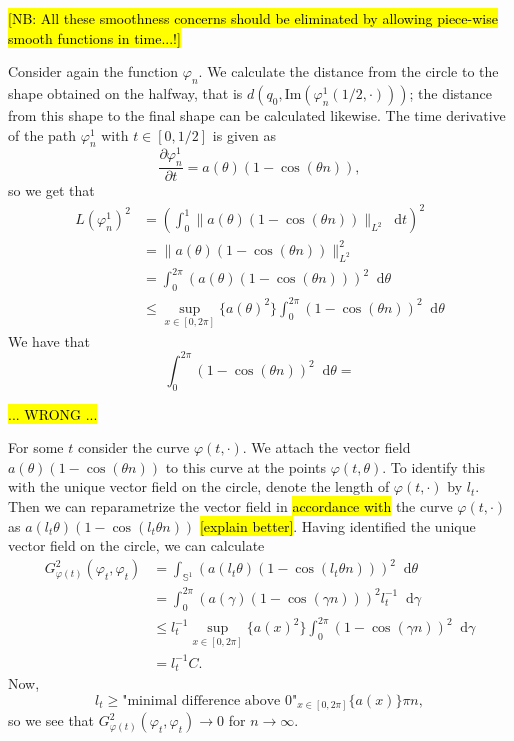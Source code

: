 \documentclass[a4,danish]{article}
\theoremstyle{break}
\theoremstyle{definition}
\theoremstyle{Break}
\renewcommand{\S}{\mathbb{S}}
\renewcommand{\phi}{\varphi}
\newcommand*\diff{\mathop{}\!\mathrm{d}}
\begin{document}
\hl{[NB: All these smoothness concerns should be eliminated by
  allowing piece-wise smooth functions in time...!]}

Consider again the function $\phi_n$. We
calculate the distance from the circle to the shape obtained on
the halfway, that is $d(q_0,\text{Im}(\phi_n^1(1/2,\cdot)))$; the
distance from this shape to the final shape can be calculated
likewise. The time derivative of the path $\phi_n^1$ with
$t \in [0,1/2]$ is given as
\begin{equation*}
  \frac{\partial \phi_{n}^1}{\partial t}  = a(\theta)(1-\cos(\theta n)),
\end{equation*}
so we get that
\begin{equation*}
  \begin{aligned}
    L(\phi^1_n)^2
    & =
    \left(
      \int_{0}^{1} \| a(\theta)(1-\cos(\theta n)) \|_{L^2}
    \diff t
  \right)^2 \\
  & = \| a(\theta)(1-\cos(\theta n)) \|_{L^2}^2 \\
  & = \int_{0}^{2\pi} \left(a(\theta)(1-\cos(\theta n)) \right)^2
  \diff \theta \\
  & \leq \sup_{x \in [0,2\pi]}\{a(\theta)^2\} \int_{0}^{2\pi} (1-\cos(\theta n))^2 \diff \theta
  \end{aligned}
\end{equation*}
We have that
\begin{equation*}
  \int_{0}^{2\pi} (1-\cos(\theta n))^2 \diff \theta =
\end{equation*}

\hl{... WRONG ...}

For some $t$ consider the curve $\phi(t,\cdot)$. We attach the vector
field $a(\theta)(1-\cos(\theta n))$ to this curve at the points
$\phi(t,\theta)$. To identify this with the unique vector field on the
circle, denote the length of $\phi(t,\cdot)$ by $l_t$. Then we can
reparametrize the vector field in \hl{accordance with} the curve
$\phi(t,\cdot)$ as $a(l_t\theta)(1-\cos(l_t\theta n))$ \hl{[explain
  better]}. Having identified the unique vector field on the circle,
we can calculate
\begin{equation*}
  \begin{aligned}
    G^2_{\phi(t)}(\phi_t,\phi_t)
    & = \int_{\S^{1}}
    (a(l_t\theta)(1-\cos(l_t\theta n)))^2 \diff \theta \\
    & = \int_0^{2\pi}
    (a(\gamma)(1-\cos(\gamma n)))^2 l_t^{-1}\diff \gamma \\
    & \leq l_t^{-1} \sup_{x \in [0,2\pi]}\{a(x)^2\} \int_{0}^{2\pi}
    (1-\cos(\gamma n))^2 \diff \gamma \\
    & = l_t^{-1} C.
  \end{aligned}
\end{equation*}
Now,
\begin{equation*}
  l_t \geq \text{"minimal difference above 0"}_{x \in [0,2\pi]}\{a(x)\} \pi n,
\end{equation*}
so we see that $G^2_{\phi(t)}(\phi_t,\phi_t) \rightarrow 0$ for $n
\rightarrow \infty$.
\end{document}
